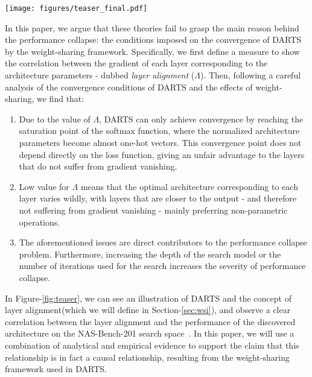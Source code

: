 \documentclass{article} \usepackage{fancyhdr, iclr2023_conference, times}
\newcommand{\lambdafn}{layer alignment\xspace}
\begin{document}
\begin{figure*}[tb]
\centering
\vspace{-15pt}
\texttt{[image: figures/teaser\_final.pdf]}
\vspace{-5pt}
\caption{An illustration of the differentiable formulation for NAS by DARTS, and the effects of \lambdafn over the trajectory of the performance of the discovered architectures by DARTS and $\Lambda$-DARTS. The experiments are performed on the NAS-Bench-201 search space, averaged over 4 runs with a $95\%$ confidence interval.}
\vspace{-15pt}
\label{fig:teaser}
\end{figure*}


In this paper, we argue that these theories fail to grasp the main reason behind the performance collapse: the conditions imposed on the convergence of DARTS by the weight-sharing framework. Specifically, we first define a measure to show the correlation between the gradient of each layer corresponding to the architecture parameters - dubbed \textit{\lambdafn} ($\Lambda$). Then, following a careful analysis of the convergence conditions of DARTS and the effects of weight-sharing, we find that:
\begin{enumerate}[itemsep=0em]
    \item Due to the value of $\Lambda$, DARTS can only achieve convergence by reaching the saturation point of the softmax function, where the normalized architecture parameters become almost one-hot vectors. This convergence point does not depend directly on the loss function, giving an unfair advantage to the layers that do not suffer from gradient vanishing.
    \item Low value for $\Lambda$ means that the optimal architecture corresponding to each layer varies wildly, with layers that are closer to the output - and therefore not suffering from gradient vanishing - mainly preferring non-parametric operations.
    \item The aforementioned issues are direct contributors to the performance collapse problem. Furthermore, increasing the depth of the search model or the number of iterations used for the search increases the severity of performance collapse.
\end{enumerate}
In Figure-\ref{fig:teaser}, we can see an illustration of DARTS and the concept of \lambdafn (which we will define in Section-\ref{sec:wsi}), and observe a clear correlation between the \lambdafn and the performance of the discovered architecture on the NAS-Bench-201 search space~\citep{DBLP:conf/iclr/Dong020}. In this paper, we will use a combination of analytical and empirical evidence to support the claim that this relationship is in fact a causal relationship, resulting from the weight-sharing framework used in DARTS. 
\end{document}
